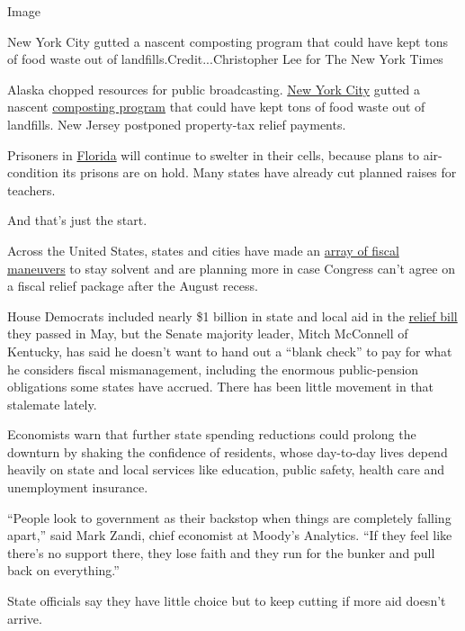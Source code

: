 Image

New York City gutted a nascent composting program that could have kept
tons of food waste out of landfills.Credit...Christopher Lee for The New
York Times

Alaska chopped resources for public broadcasting.
\href{https://www1.nyc.gov/assets/dsny/site/services/food-scraps-and-yard-waste-page/overview-residents-organics}{New
York City} gutted a nascent
\href{https://www1.nyc.gov/assets/dsny/site/services/food-scraps-and-yard-waste-page/overview-residents-organics}{composting
program} that could have kept tons of food waste out of landfills. New
Jersey postponed property-tax relief payments.

Prisoners in
\href{https://www.tampabay.com/news/health/2020/07/02/desantis-cuts-money-for-prison-updates-hepatitis-c-treatment/}{Florida}
will continue to swelter in their cells, because plans to air-condition
its prisons are on hold. Many states have already cut planned raises for
teachers.

And that's just the start.

Across the United States, states and cities have made an
\href{https://www.nytimes3xbfgragh.onion/2020/05/14/business/virus-state-budgets.html}{array
of fiscal maneuvers} to stay solvent and are planning more in case
Congress can't agree on a fiscal relief package after the August recess.

House Democrats included nearly \$1 billion in state and local aid in
the
\href{https://www.congress.gov/116/bills/hr6800/BILLS-116hr6800ih.pdf}{relief
bill} they passed in May, but the Senate majority leader, Mitch
McConnell of Kentucky, has said he doesn't want to hand out a ``blank
check'' to pay for what he considers fiscal mismanagement, including the
enormous public-pension obligations some states have accrued. There has
been little movement in that stalemate lately.

Economists warn that further state spending reductions could prolong the
downturn by shaking the confidence of residents, whose day-to-day lives
depend heavily on state and local services like education, public
safety, health care and unemployment insurance.

``People look to government as their backstop when things are completely
falling apart,'' said Mark Zandi, chief economist at Moody's Analytics.
``If they feel like there's no support there, they lose faith and they
run for the bunker and pull back on everything.''

State officials say they have little choice but to keep cutting if more
aid doesn't arrive.

